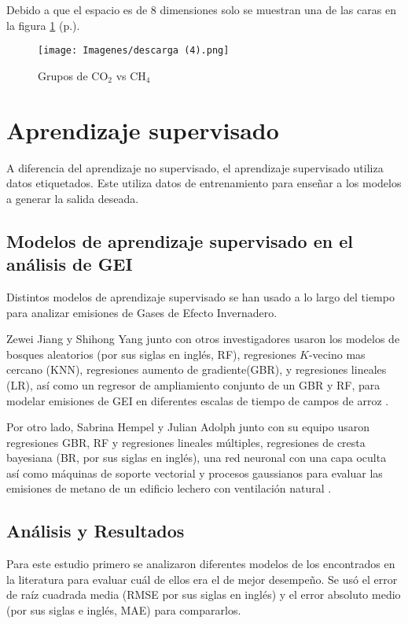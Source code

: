 \documentclass[13.6pt]{article}
\begin{document}
Debido a que el espacio es de 8 dimensiones solo se muestran una de las caras en la figura \ref{fig: CO2VCH4} (p.\pageref{fig: CO2VCH4}).

\begin{figure}
\texttt{[image: Imagenes/descarga (4).png]}
\caption{Grupos de CO$_2$ vs CH$_4$}
\label{fig: CO2VCH4}
\end{figure}


\section{Aprendizaje supervisado}

A diferencia del aprendizaje no supervisado, el aprendizaje supervisado utiliza datos etiquetados. Este utiliza datos de entrenamiento para enseñar a los modelos a generar la salida deseada.

\subsection{Modelos de aprendizaje supervisado en el análisis de GEI}

Distintos modelos de aprendizaje supervisado se han usado a lo largo del tiempo para analizar emisiones de Gases de Efecto Invernadero.

Zewei Jiang y Shihong Yang junto con otros investigadores usaron los modelos de bosques aleatorios (por sus siglas en inglés, RF), regresiones $K$-vecino mas cercano (KNN), regresiones aumento de gradiente(GBR), y regresiones lineales (LR), así como un regresor de ampliamiento conjunto de un GBR y RF, para modelar emisiones de GEI en diferentes escalas de tiempo de campos de arroz \citep{JIANG2023108821} .

Por otro lado, Sabrina Hempel y Julian Adolph junto con su equipo usaron regresiones GBR, RF y regresiones lineales múltiples, regresiones de cresta bayesiana (BR, por sus siglas en inglés), una red neuronal con una capa oculta así como máquinas de soporte vectorial y procesos gaussianos para evaluar las emisiones de metano de un edificio lechero con ventilación natural \citep{app10196938}.


\subsection{Análisis y Resultados}

Para este estudio primero se analizaron diferentes modelos de los encontrados en la literatura para evaluar cuál de ellos era el de mejor desempeño. Se usó el error de raíz cuadrada media (RMSE por sus siglas en inglés) y el error absoluto medio (por sus siglas e inglés, MAE) para compararlos.
\end{document}
